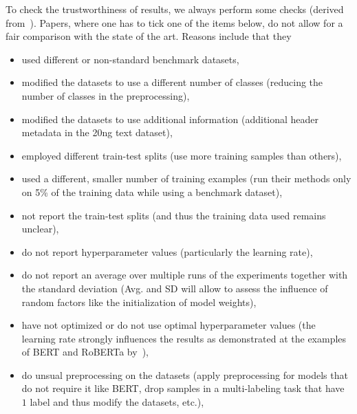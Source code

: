 \documentclass[sigconf, review, nonacm]{acmart}
\begin{document}
\begin{tcolorbox}[title=Instructions]
To check the trustworthiness of results, we always perform some checks (derived from~\cite{DBLP:journals/corr/abs-2204-03954v5-textclassification}).
%
Papers, where one has to tick one of the items below, do not allow for a fair comparison with the state of the art.
Reasons include that they 

\begin{itemize}
\item used different or non-standard benchmark datasets,

\item modified the datasets to use a different number of classes (\ie reducing the number of classes in the preprocessing),

\item modified the datasets to use additional information (\eg additional header metadata in the 20ng text dataset),

\item employed different train-test splits (\eg use more training samples than others), 

\item used a different, smaller number of training examples (\eg run their methods only on 5\% of the training data while using a benchmark dataset),

\item not report the train-test splits (and thus the training data used remains unclear),

\item do not report hyperparameter values (particularly the learning rate), 

\item do not report an average over multiple runs of the experiments together with the standard deviation (Avg. and SD will allow to assess the influence of random factors like the initialization of model weights),  

\item have not optimized or do not use optimal hyperparameter values (\eg the learning rate strongly influences the results as demonstrated at the examples of BERT and RoBERTa by~\citet{DBLP:journals/corr/abs-2204-03954v5-textclassification}), 

\item do unsual preprocessing on the datasets (\eg apply preprocessing for models that do not require it like BERT, drop samples in a multi-labeling task that have $1$ label and thus modify the datasets, etc.),
%


\end{itemize}
\end{tcolorbox}
\end{document}
